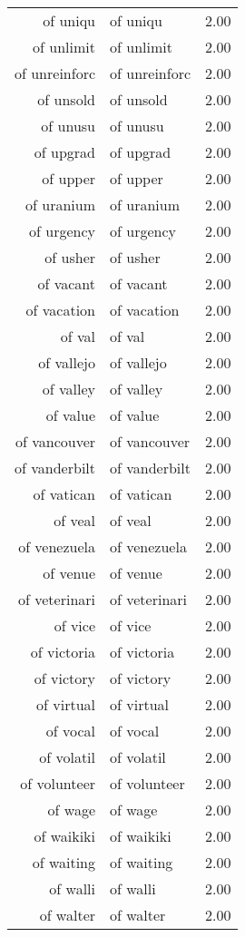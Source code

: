 \begin{table}[ht]
\begin{tabular}{rlr}
  of uniqu & of uniqu & 2.00 \\ 
  of unlimit & of unlimit & 2.00 \\ 
  of unreinforc & of unreinforc & 2.00 \\ 
  of unsold & of unsold & 2.00 \\ 
  of unusu & of unusu & 2.00 \\ 
  of upgrad & of upgrad & 2.00 \\ 
  of upper & of upper & 2.00 \\ 
  of uranium & of uranium & 2.00 \\ 
  of urgency & of urgency & 2.00 \\ 
  of usher & of usher & 2.00 \\ 
  of vacant & of vacant & 2.00 \\ 
  of vacation & of vacation & 2.00 \\ 
  of val & of val & 2.00 \\ 
  of vallejo & of vallejo & 2.00 \\ 
  of valley & of valley & 2.00 \\ 
  of value & of value & 2.00 \\ 
  of vancouver & of vancouver & 2.00 \\ 
  of vanderbilt & of vanderbilt & 2.00 \\ 
  of vatican & of vatican & 2.00 \\ 
  of veal & of veal & 2.00 \\ 
  of venezuela & of venezuela & 2.00 \\ 
  of venue & of venue & 2.00 \\ 
  of veterinari & of veterinari & 2.00 \\ 
  of vice & of vice & 2.00 \\ 
  of victoria & of victoria & 2.00 \\ 
  of victory & of victory & 2.00 \\ 
  of virtual & of virtual & 2.00 \\ 
  of vocal & of vocal & 2.00 \\ 
  of volatil & of volatil & 2.00 \\ 
  of volunteer & of volunteer & 2.00 \\ 
  of wage & of wage & 2.00 \\ 
  of waikiki & of waikiki & 2.00 \\ 
  of waiting & of waiting & 2.00 \\ 
  of walli & of walli & 2.00 \\ 
  of walter & of walter & 2.00 \\ 

\end{tabular}
\end{table}
